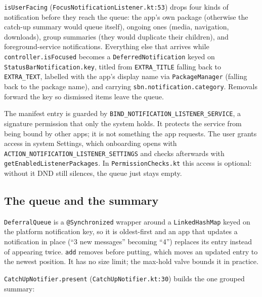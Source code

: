 \documentclass[10pt,a4paper]{article}
\newcommand{\file}[1]{\texttt{\small #1}}          %
\newcommand{\code}[1]{\texttt{#1}}                  %
\begin{document}
\code{isUserFacing} (\file{FocusNotificationListener.kt:53}) drops four kinds of notification
before they reach the queue: the app's own package (otherwise the catch-up summary would queue
itself), ongoing ones (media, navigation, downloads), group summaries (they would duplicate their
children), and foreground-service notifications. Everything else that arrives while
\code{controller.isFocused} becomes a \code{DeferredNotification} keyed on
\code{StatusBarNotification.key}, titled from \code{EXTRA\_TITLE} falling back to
\code{EXTRA\_TEXT}, labelled with the app's display name via \code{PackageManager} (falling back
to the package name), and carrying \code{sbn.notification.category}. Removals forward the key so
dismissed items leave the queue.

The manifest entry is guarded by \code{BIND\_NOTIFICATION\_LISTENER\_SERVICE}, a signature
permission that only the system holds. It protects the service from being bound by other apps; it
is not something the app requests. The user grants access in system Settings, which onboarding
opens with \code{ACTION\_NOTIFICATION\_LISTENER\_SETTINGS} and checks afterwards with
\code{getEnabledListenerPackages}. In \file{PermissionChecks.kt} this access is optional: without
it DND still silences, the queue just stays empty.

\subsection{The queue and the summary}

\code{DeferralQueue} is a \code{@Synchronized} wrapper around a \code{LinkedHashMap} keyed on the
platform notification key, so it is oldest-first and an app that updates a notification in place
(``3 new messages'' becoming ``4'') replaces its entry instead of appearing twice. \code{add}
removes before putting, which moves an updated entry to the newest position. It has no size limit;
the max-hold valve bounds it in practice.

\code{CatchUpNotifier.present} (\file{CatchUpNotifier.kt:30}) builds the one grouped summary:
\end{document}
